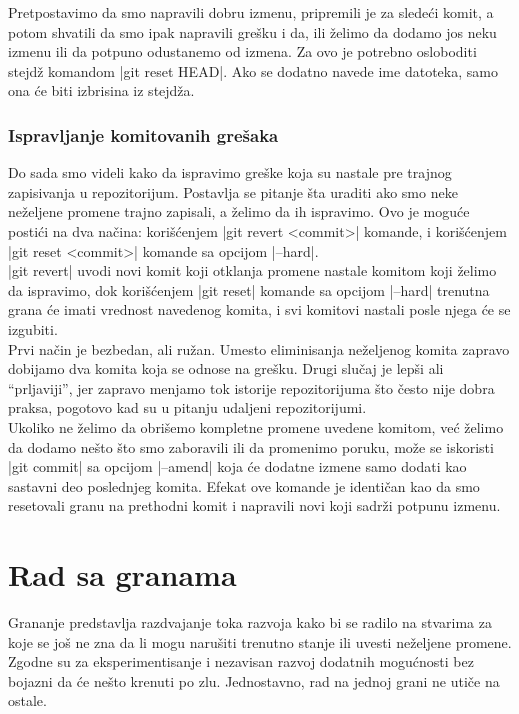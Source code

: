 \documentclass[a4paper]{article}
\begin{document}
{Pretpostavimo da smo napravili dobru izmenu, pripremili je za sledeći komit, a potom shvatili da smo ipak napravili grešku i da, ili želimo da dodamo jos neku izmenu ili da potpuno odustanemo od izmena. Za ovo je potrebno osloboditi stejdž komandom |git reset HEAD|. Ako se dodatno navede ime datoteka, samo ona će biti izbrisina iz stejdža.

\subsubsection*{Ispravljanje komitovanih grešaka}
\label{komitovane_greske}
Do sada smo videli kako da ispravimo greške koja su nastale pre trajnog zapisivanja u repozitorijum. Postavlja se pitanje šta uraditi ako smo neke neželjene promene trajno zapisali, a želimo da ih ispravimo. Ovo je moguće postići na dva načina: korišćenjem |git revert <commit>| komande, i korišćenjem |git reset <commit>| komande sa opcijom |--hard|.\\

|git revert| uvodi novi komit koji otklanja promene nastale komitom koji želimo da ispravimo, dok korišćenjem |git reset| komande sa opcijom |--hard| trenutna grana će imati vrednost navedenog komita, i svi komitovi nastali posle njega će se izgubiti. \\

Prvi način je bezbedan, ali ružan. Umesto eliminisanja neželjenog komita zapravo dobijamo dva komita koja se odnose na grešku. Drugi slučaj je lepši ali ``prljaviji'', jer zapravo menjamo tok istorije repozitorijuma što često nije dobra praksa, pogotovo kad su u pitanju udaljeni repozitorijumi. \\

Ukoliko ne želimo da obrišemo kompletne promene uvedene komitom, već želimo da dodamo nešto što smo zaboravili ili da promenimo poruku, može se iskoristi |git commit| sa opcijom |--amend| koja će dodatne izmene samo dodati kao sastavni deo poslednjeg komita. Efekat ove komande je identičan kao da smo resetovali granu na prethodni komit i napravili novi koji sadrži potpunu izmenu.


\section{Rad sa granama}
\label{sec:grane}
Grananje predstavlja razdvajanje toka razvoja kako bi se radilo na stvarima za koje se još ne zna da li mogu narušiti trenutno stanje ili uvesti neželjene promene. Zgodne su za eksperimentisanje i nezavisan razvoj dodatnih mogućnosti bez bojazni da će nešto krenuti po zlu. Jednostavno, rad na jednoj grani ne utiče na ostale.\\

}
\end{document}
